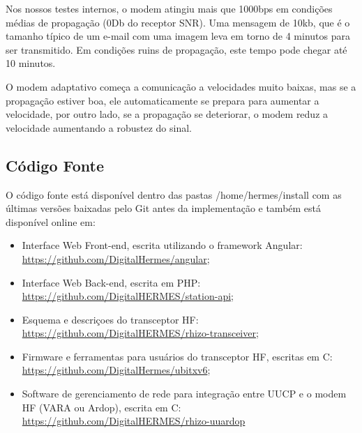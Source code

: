 \documentclass[11pt,a4paper]{article}
\begin{document}
Nos nossos testes internos, o modem atingiu mais que 1000bps em condições médias de propagação (0Db do receptor SNR). Uma mensagem de 10kb, que é o tamanho típico de um e-mail com uma imagem leva em torno de 4 minutos para ser transmitido. Em condições ruins de propagação, este tempo pode chegar até 10 minutos.


O modem adaptativo começa a comunicação a velocidades muito baixas, mas se a propagação estiver boa, ele automaticamente se prepara para aumentar a velocidade, por outro lado, se a propagação se deteriorar, o modem reduz a velocidade aumentando a robustez do sinal. 
    
    

\subsection{Código Fonte}
\label{apx_src}

O código fonte está disponível dentro das pastas /home/hermes/install com as últimas versões baixadas pelo Git antes da implementação e também está disponível online em: 

\begin{itemize}
    \item Interface Web Front-end, escrita utilizando o framework Angular: \url{https://github.com/DigitalHermes/angular};
    \item Interface Web Back-end, escrita em PHP: \url{https://github.com/DigitalHERMES/station-api}; 
    \item Esquema e descriçoes do transceptor HF: \url{https://github.com/DigitalHERMES/rhizo-transceiver};
    \item Firmware e ferramentas para usuários do transceptor HF, escritas em C:
    \url{https://github.com/DigitalHermes/ubitxv6};
    \item Software de gerenciamento de rede para integração entre UUCP e o modem HF (VARA ou Ardop), escrita em C:
    \url{https://github.com/DigitalHERMES/rhizo-uuardop}
\end{itemize}
\end{document}
